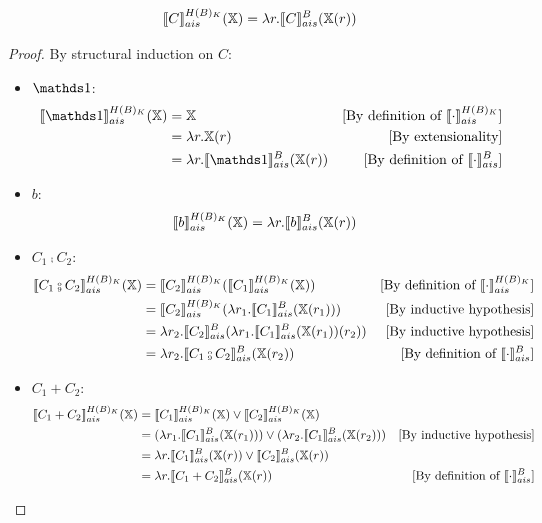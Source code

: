 \documentclass[
  10pt,       %
  twoside,    %
  a4paper,    %
  english,    %
  tikz,       %
  openright,  %
]{book}
\begin{document}
\begin{theorem}
    \label{thm:hyper-add}
    $$\asem[H(B)_K]{C}(\mathcal{\chi}) = \lambda r . \asem[B]{C}(\chi(r))$$
\end{theorem}
\begin{proof}
  By structural induction on $C$:
  \begin{itemize}
    \item $\sskip$:
      \begin{align*}
        \asem[H(B)_K]{\sskip}(\chi) 
          &= \chi
          &\text{[By definition of $\asem[H(B)_K]{\cdot}$]} \\
          &= \lambda r . \chi(r) 
          &\text{[By extensionality]}\\
          &= \lambda r . \asem[B]{\sskip}(\chi(r))
          &\text{[By definition of $\asem[B]{\cdot}$]} \\
      \end{align*}

    \item $b$:
      \begin{align*}
        \asem[H(B)_K]{b}(\chi) 
          &= \lambda r . \asem[B]{b}(\chi(r))
      \end{align*}

    \item $C_1 \fcmp C_2$:
      \begin{align*}
        \asem[H(B)_K]{C_1 \fcmp C_2}(\chi) 
          &= \asem[H(B)_K]{C_2}(\asem[H(B)_K]{C_1}(\chi))
          &\text{[By definition of $\asem[H(B)_K]{\cdot}$]} \\
          &= \asem[H(B)_K]{C_2}(\lambda r_1 . \asem[B]{C_1}(\chi(r_1)))
          &\text{[By inductive hypothesis]} \\
          &= \lambda r_2 . \asem[B]{C_2}(\lambda r_1 . \asem[B]{C_1}(\chi(r_1))(r_2))
          &\text{[By inductive hypothesis]} \\
          &= \lambda r_2 . \asem[B]{C_1 \fcmp C_2}(\chi(r_2))
          &\text{[By definition of $\asem[B]{\cdot}$]} \\
      \end{align*}

    \item $C_1 + C_2$:
      \begin{align*}
        \asem[H(B)_K]{C_1 + C_2}(\chi)
          &= \asem[H(B)_K]{C_1}(\chi) \lor \asem[H(B)_K]{C_2}(\chi) \\
          &= (\lambda r_1 . \asem[B]{C_1}(\chi(r_1))) \lor (\lambda r_2 . \asem[B]{C_1}(\chi(r_2)))
          &\text{[By inductive hypothesis]} \\
          &= \lambda r . \asem[B]{C_1}(\chi(r)) \lor \asem[B]{C_2}(\chi(r)) \\
          &= \lambda r . \asem[B]{C_1 + C_2}(\chi(r))
          &\text{[By definition of $\asem[B]{\cdot}$]} \\
      \end{align*}


\end{itemize}
\end{proof}
\end{document}
